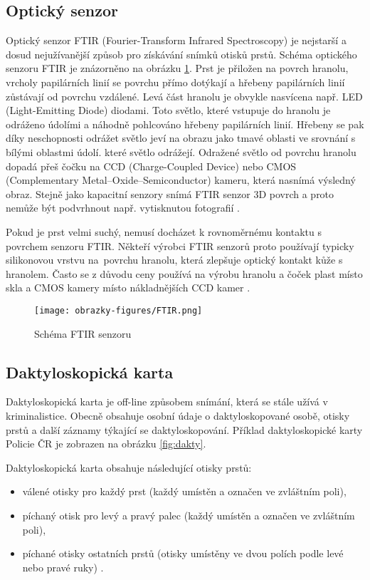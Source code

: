 \subsection{Optický senzor}
Optický senzor FTIR (Fourier-Transform Infrared Spectroscopy) je nejstarší a dosud nejužívanější způsob pro získávání snímků otisků prstů. Schéma optického senzoru FTIR je znázorněno na obrázku \ref{fig:ftir}. Prst je přiložen na povrch hranolu, vrcholy papilárních linií se povrchu přímo dotýkají a hřebeny papilárních linií zůstávají od povrchu vzdálené. Levá část hranolu je obvykle nasvícena např. LED (Light-Emitting Diode) diodami. Toto světlo, které vstupuje do hranolu je odráženo údolími a náhodně pohlcováno hřebeny papilárních linií. Hřebeny se pak díky neschopnosti odrážet světlo jeví na obrazu jako tmavé oblasti ve srovnání s bílými oblastmi údolí. které světlo odrážejí. Odražené světlo od povrchu hranolu dopadá přeš čočku na CCD (Charge-Coupled Device) nebo CMOS (Complementary Metal–Oxide–Semiconductor) kameru, která nasnímá výsledný obraz. Stejně jako kapacitní senzory snímá FTIR senzor 3D povrch a proto nemůže být podvrhnout např. vytisknutou fotografií \cite{Maltoni2009}.

Pokud je prst velmi suchý, nemusí docházet k rovnoměrnému kontaktu s povrchem senzoru FTIR. Někteří výrobci FTIR senzorů proto používají typicky silikonovou vrstvu na~povrchu hranolu, která zlepšuje optický kontakt kůže s hranolem. Často se z důvodu ceny používá na výrobu hranolu a čoček plast místo skla a CMOS kamery místo nákladnějších CCD kamer \cite{Maltoni2009}.

\begin{figure}[!htbp]
    \centering
    \texttt{[image: obrazky-figures/FTIR.png]}
    \caption{Schéma FTIR senzoru \cite{Maltoni2009}}
    \label{fig:ftir}
\end{figure}
\subsection{Daktyloskopická karta}
Daktyloskopická karta je off-line způsobem snímání, která se stále užívá v kriminalistice. Obecně obsahuje osobní údaje o daktyloskopované osobě, otisky prstů a další záznamy týkající se daktyloskopování. Příklad daktyloskopické karty Policie ČR je zobrazen na obrázku \ref{fig:dakty}.

Daktyloskopická karta obsahuje následující otisky prstů:
\begin{itemize}
    \item válené otisky pro každý prst (každý umístěn a označen ve zvláštním poli),
    \item píchaný otisk pro levý a pravý palec (každý umístěn a označen ve zvláštním poli),
    \item píchané otisky ostatních prstů (otisky umístěny ve dvou polích podle levé nebo pravé ruky) \cite{BIOdaktylLecture}.
\end{itemize}

